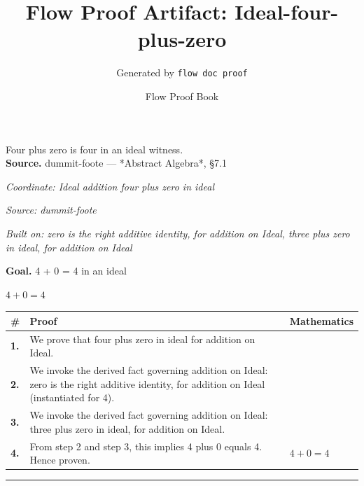 \documentclass[11pt]{article}
\title{Flow Proof Artifact: Ideal-four-plus-zero}
\author{Generated by \texttt{flow doc proof}}
\date{Flow Proof Book}
\theoremstyle{definition}
\begin{document}
\maketitle
Four plus zero is four in an ideal witness.\\[0.5em]
\textbf{Source.} dummit-foote — *Abstract Algebra*, §7.1\\[0.5em]
\bigskip
{}\par
\smallskip\noindent\textit{Coordinate: Ideal \cdot addition \cdot four plus zero in ideal}\par
\smallskip\noindent\textit{Source: dummit-foote}\par
\smallskip\noindent\textit{Built on: zero is the right additive identity, for addition on Ideal, three plus zero in ideal, for addition on Ideal}\par
\medskip
\noindent\textbf{Goal.} 4 + 0 = 4 in an ideal\par
\noindent$\displaystyle 4 + 0 = 4$\par
\medskip
\noindent
\begin{tabular}{@{} >{\raggedright\arraybackslash}p{} >{\raggedright\arraybackslash}p{} >{\raggedleft\arraybackslash}p{} @{}}
\textbf{\#} & \textbf{Proof} & \textbf{Mathematics} \\
\midrule
\textbf{1.} & We prove that four plus zero in ideal for addition on Ideal. & \\[0.45em]
\textbf{2.} & We invoke the derived fact governing addition on Ideal: zero is the right additive identity, for addition on Ideal (instantiated for 4). & \\[0.45em]
\textbf{3.} & We invoke the derived fact governing addition on Ideal: three plus zero in ideal, for addition on Ideal. & \\[0.45em]
\textbf{4.} & From step 2 and step 3, this implies 4 plus 0 equals 4. Hence proven. & $\displaystyle 4 + 0 = 4$ \\[0.45em]
\bottomrule
\end{tabular}
\label{thm:Ideal-addition-four_plus_zero_in_ideal}
\par\medskip\hrule
\end{document}
